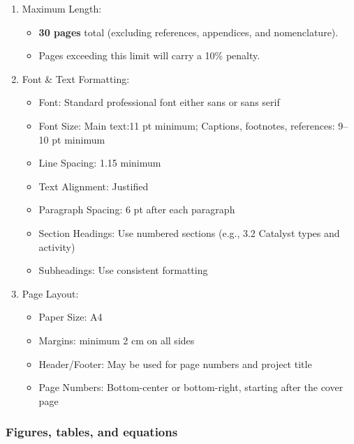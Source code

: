 \documentclass[
  12pt,
  a4paperpaper,
  DIV=11,
  numbers=noendperiod]{scrartcl}
\providecommand{\tightlist}{%
  \setlength{\itemsep}{0pt}\setlength{\parskip}{0pt}}\usepackage{longtable,booktabs,array}
\begin{document}
\begin{enumerate}
\def\labelenumi{\arabic{enumi}.}
\tightlist
\item
  Maximum Length:

  \begin{itemize}
  \tightlist
  \item
    \textbf{30 pages} total (excluding references, appendices, and
    nomenclature).
  \item
    Pages exceeding this limit will carry a 10\% penalty.
  \end{itemize}
\item
  Font \& Text Formatting:

  \begin{itemize}
  \tightlist
  \item
    Font: Standard professional font either sans or sans serif
  \item
    Font Size: Main text:11 pt minimum; Captions, footnotes, references:
    9--10 pt minimum
  \item
    Line Spacing: 1.15 minimum
  \item
    Text Alignment: Justified
  \item
    Paragraph Spacing: 6 pt after each paragraph
  \item
    Section Headings: Use numbered sections (e.g., 3.2 Catalyst types
    and activity)
  \item
    Subheadings: Use consistent formatting
  \end{itemize}
\item
  Page Layout:

  \begin{itemize}
  \tightlist
  \item
    Paper Size: A4
  \item
    Margins: minimum 2 cm on all sides
  \item
    Header/Footer: May be used for page numbers and project title
  \item
    Page Numbers: Bottom-center or bottom-right, starting after the
    cover page
  \end{itemize}
\end{enumerate}

\subsubsection{Figures, tables, and
equations}\label{figures-tables-and-equations}
\end{document}
